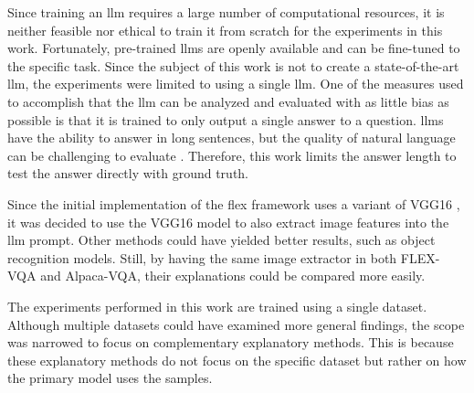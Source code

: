     
    
    Since training an \gls{llm} requires a large number of computational resources, it is neither feasible nor ethical to train it from scratch for the experiments in this work. Fortunately, pre-trained \glspl{llm} are openly available and can be fine-tuned to the specific task. Since the subject of this work is not to create a state-of-the-art \gls{llm}, the experiments were limited to using a single \gls{llm}.
    One of the measures used to accomplish that the \gls{llm} can be analyzed and evaluated with as little bias as possible is that it is trained to only output a single answer to a question. \glspl{llm} have the ability to answer in long sentences, but the quality of natural language can be challenging to evaluate \cite{reiterStructuredReviewValidity2018}. Therefore, this work limits the answer length to test the answer directly with ground truth.

    Since the initial implementation of the \gls{flex} framework uses a variant of VGG16 \cite{simonyanVeryDeepConvolutional2015, gaoCompactBilinearPooling2016}, it was decided to use the VGG16 model to also extract image features into the \gls{llm} prompt. 
    Other methods could have yielded better results, such as object recognition models. Still, by having the same image extractor in both FLEX-VQA and Alpaca-VQA, their explanations could be compared more easily.


    The experiments performed in this work are trained using a single dataset. Although multiple datasets could have examined more general findings, the scope was narrowed to focus on complementary explanatory methods. This is because these explanatory methods do not focus on the specific dataset but rather on how the primary model uses the samples.
    
   
    
